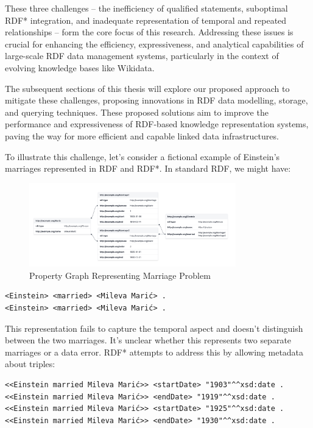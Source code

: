 These three challenges – the inefficiency of qualified statements, suboptimal RDF* integration, and inadequate representation of temporal and repeated relationships – form the core focus of this research. Addressing these issues is crucial for enhancing the efficiency, expressiveness, and analytical capabilities of large-scale RDF data management systems, particularly in the context of evolving knowledge bases like Wikidata.

The subsequent sections of this thesis will explore our proposed approach to mitigate these challenges, proposing innovations in RDF data modelling, storage, and querying techniques. These proposed solutions aim to improve the performance and expressiveness of RDF-based knowledge representation systems, paving the way for more efficient and capable linked data infrastructures.

To illustrate this challenge, let's consider a fictional example of Einstein's marriages represented in RDF and RDF*. In standard RDF, we might have:

\begin{figure}[htbp]
    \centering
    \includegraphics[width=0.8\textwidth]{11.png}
    \caption{Property Graph Representing Marriage Problem}
    \label{fig:image11}
\end{figure}

{\footnotesize
\begin{verbatim}
<Einstein> <married> <Mileva Marić> .
<Einstein> <married> <Mileva Marić> .
\end{verbatim}
}

This representation fails to capture the temporal aspect and doesn't distinguish between the two marriages. It's unclear whether this represents two separate marriages or a data error. RDF* attempts to address this by allowing metadata about triples:

{\footnotesize
\begin{verbatim}
<<Einstein married Mileva Marić>> <startDate> "1903"^^xsd:date .
<<Einstein married Mileva Marić>> <endDate> "1919"^^xsd:date .
<<Einstein married Mileva Marić>> <startDate> "1925"^^xsd:date .
<<Einstein married Mileva Marić>> <endDate> "1930"^^xsd:date .
\end{verbatim}
}

